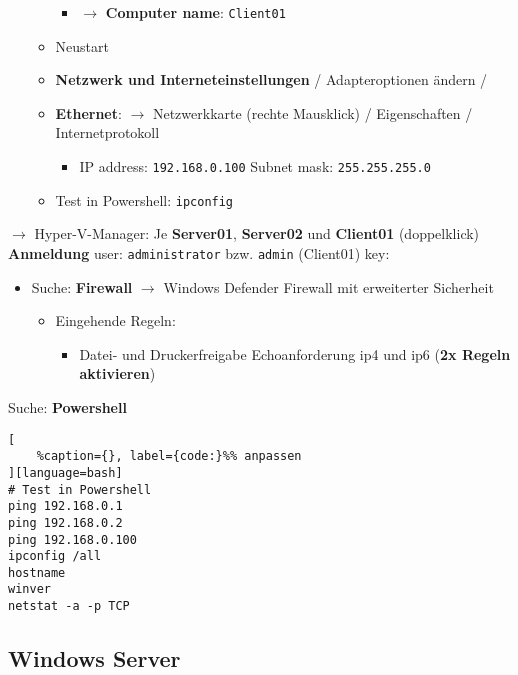 \begin{enumerate}
\begin{itemize}
    \begin{itemize}
    \item
      $\to$ \textbf{Computer name}: \verb|Client01|
    \end{itemize}
  \item
    Neustart
  \item
    \textbf{Netzwerk und Interneteinstellungen} / Adapteroptionen ändern
    /
  \item
    \textbf{Ethernet}: $\to$ Netzwerkkarte (rechte Mausklick) /
    Eigenschaften / Internetprotokoll

    \begin{itemize}
    \item
      IP address: \verb|192.168.0.100| Subnet mask:
      \verb|255.255.255.0|
    \end{itemize}
  \item
    Test in Powershell: \verb|ipconfig|
  \end{itemize}
\end{enumerate}

$\to$ Hyper-V-Manager: Je \textbf{Server01}, \textbf{Server02} und
\textbf{Client01} (doppelklick) \textbf{Anmeldung} user:
\verb|administrator| bzw.
\verb|admin| (Client01) key:

\begin{itemize}
\item
  Suche: \textbf{Firewall} $\to$ Windows Defender Firewall mit
  erweiterter Sicherheit

  \begin{itemize}
  \item
    Eingehende Regeln:

    \begin{itemize}
    \item
      Datei- und Druckerfreigabe Echoanforderung ip4 und ip6 (\textbf{2x
      Regeln aktivieren})
    \end{itemize}
  \end{itemize}
\end{itemize}

Suche: \textbf{Powershell}

\lstset{language=Python}%
\begin{lstlisting}[
	%caption={}, label={code:}%% anpassen
][language=bash]
# Test in Powershell
ping 192.168.0.1
ping 192.168.0.2
ping 192.168.0.100
ipconfig /all
hostname 
winver
netstat -a -p TCP
\end{lstlisting}

\subsection{Windows Server}\label{windows-server}

